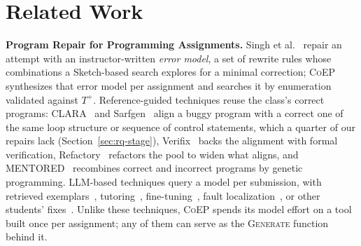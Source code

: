 \documentclass[acmsmall,screen,review,anonymous,nonacm]{acmart}
\newcommand{\tool}{\textsc{CoEP}\xspace}
\newcommand{\Fn}[1]{\textsc{#1}}
\begin{document}
\section{Related Work}
\label{sec:related}

\textbf{Program Repair for Programming Assignments.} Singh et al.~\cite{singh2013automated} repair an attempt with an instructor-written \emph{error model}, a set of rewrite rules whose combinations a Sketch-based search explores for a minimal correction; \tool synthesizes that error model per assignment and searches it by enumeration validated against $T^{+}$. Reference-guided techniques reuse the class's correct programs: CLARA~\cite{gulwani2018automated} and Sarfgen~\cite{wang2018search} align a buggy program with a correct one of the same loop structure or sequence of control statements, which a quarter of our repairs lack (Section~\ref{sec:rq-stage}), Verifix~\cite{ahmed2022verifix} backs the alignment with formal verification, Refactory~\cite{hu2019re} refactors the pool to widen what aligns, and MENTORED~\cite{choi2025automated} recombines correct and incorrect programs by genetic programming. LLM-based techniques query a model per submission, with retrieved exemplars~\cite{zhang2024pydex}, tutoring~\cite{yang2024cref}, fine-tuning~\cite{liu2024fastfixer,yang2026morepair}, fault localization~\cite{dai2025less,orvalho2025counterexample,orvalho2025mentor}, or other students' fixes~\cite{dai2026learner}. Unlike these techniques, \tool spends its model effort on a tool built once per assignment; any of them can serve as the \Fn{Generate} function behind it.
\end{document}
